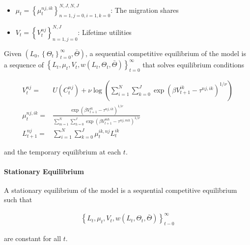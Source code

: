 \documentclass[10pt]{article}
\begin{document}
\begin{itemize}
    \item $\mu_t=\left\{\mu_t^{n j, i k}\right\}_{n=1, j=0, i=1, k=0}^{N, J, N, J}$: The migration shares
    \item $V_t=\left\{V_t^{n j}\right\}_{n=1, j=0}^{N, J}$: Lifetime utilities
\end{itemize}

\begin{definition}
    
    Given $\left(L_0,\left\{\Theta_t\right\}_{t=0}^{\infty}, \bar{\Theta}\right)$, 
    a sequential competitive equilibrium of the model is a sequence of 
    $\left\{L_t, \mu_t, V_t, w\left(L_t, \Theta_t, \bar{\Theta}\right)\right\}_{t=0}^{\infty}$ 
    that solves equilibrium conditions 
    
    \begin{align}
        V_t^{n j}=&U\left(C_t^{n j}\right)+\nu \log \left(\sum_{i=1}^N \sum_{k=0}^J \exp \left(\beta V_{t+1}^{i k}-\tau^{n j, i k}\right)^{1 / \nu}\right) \\
        \mu_t^{n j, i k}=&\frac{\exp \left(\beta V_{t+1}^{i k}-\tau^{n j, i k}\right)^{1 / \nu}}{\sum_{m=1}^N \sum_{h=0}^J \exp \left(\beta V_{t+1}^{m h}-\tau^{n j, m h}\right)^{1 / \nu}} \\
        L_{t+1}^{n j}=&\sum_{i=1}^N \sum_{k=0}^J \mu_t^{i k, n j} L_t^{i k}
    \end{align}

    and the 
    temporary equilibrium at each $t$.
    
\end{definition}

\paragraph{Stationary Equilibrium}

\begin{definition} 
    
    A stationary equilibrium of the model is a sequential competitive 
    equilibrium such that 
    
    \begin{align}
        \left\{L_t, \mu_t, V_t, w\left(L_t, \Theta_t, \bar{\Theta}\right)\right\}_{t-0}^{\infty}
    \end{align}
    
    are constant for all $t$.

\end{definition}
\end{document}
